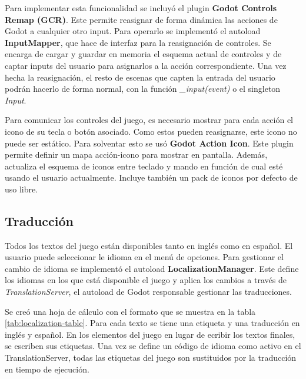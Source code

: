 Para implementar esta funcionalidad se incluyó el plugin \textbf{Godot Controls Remap (GCR)}\cite{controls-remap}. Este permite reasignar de forma dinámica las acciones de Godot a cualquier otro input. Para operarlo se implementó el autoload \textbf{InputMapper}, que hace de interfaz para la reasignación de controles. Se encarga de cargar y guardar en memoria el esquema actual de controles y de captar inputs del usuario para asignarlos a la acción correspondiente. Una vez hecha la reasignación, el resto de escenas que capten la entrada del usuario podrán hacerlo de forma normal, con la función \textit{\_input(event)} o el singleton \textit{Input}.

Para comunicar los controles del juego, es necesario mostrar para cada acción el icono de su tecla o botón asociado. Como estos pueden reasignarse, este icono no puede ser estático. Para solventar esto se usó \textbf{Godot Action Icon}\cite{action-icon}. Este plugin permite definir un mapa acción-icono para mostrar en pantalla. Además, actualiza el esquema de iconos entre teclado y mando en función de cual esté usando el usuario actualmente. Incluye también un pack de iconos por defecto de uso libre\cite{icon-pack}.

\subsection{Traducción}

Todos los textos del juego están disponibles tanto en inglés como en español. El usuario puede seleccionar le idioma en el menú de opciones. Para gestionar el cambio de idioma se implementó el autoload \textbf{LocalizationManager}. Este define los idiomas en los que está disponible el juego y aplica los cambios a través de \textit{TranslationServer}, el autoload de Godot responsable gestionar las traducciones. 

Se creó una hoja de cálculo con el formato que se muestra en la tabla \ref{tab:localization-table}. Para cada texto se tiene una etiqueta y una traducción en inglés y español. En los elementos del juego en lugar de ecribir los textos finales, se escriben sus etiquetas. Una vez se define un código de idioma como activo en el TranslationServer, todas las etiquetas del juego son sustituidos por la traducción en tiempo de ejecución.

